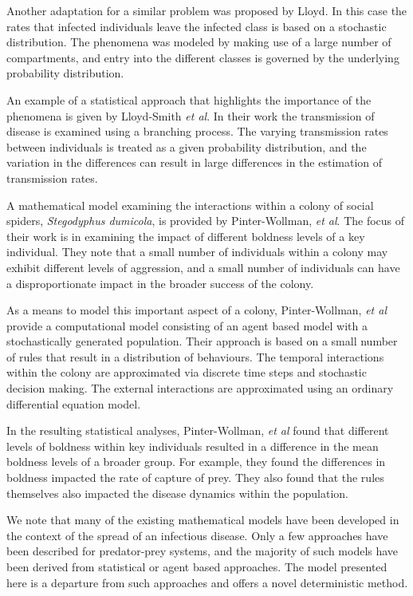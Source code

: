 \documentclass[review]{elsarticle}
\begin{document}
Another adaptation for a similar problem was proposed by
Lloyd\cite{doi:10.1098/rspb.2001.1599}. In this case the rates that
infected individuals leave the infected class is based on a stochastic
distribution. The phenomena was modeled by making use of a large
number of compartments, and entry into the different classes is
governed by the underlying probability distribution.

An example of a statistical approach that highlights the importance of
the phenomena is given by Lloyd-Smith \textit{et
  al}\cite{SuperspreadingLloyd}. In their work the transmission of
disease is examined using a branching process. The varying
transmission rates between individuals is treated as a given
probability distribution, and the variation in the differences can
result in large differences in the estimation of transmission rates.

A mathematical model examining the interactions within a colony of
social spiders, \textit{Stegodyphus dumicola}, is provided by
Pinter-Wollman, \textit{et al}\cite{doi:10.1086/687235}. The focus of
their work is in examining the impact of different boldness levels of
a key individual.  They note that a small number of individuals within
a colony may exhibit different levels of aggression, and a small
number of individuals can have a disproportionate impact in the
broader success of the colony.

As a means to model this important aspect of a colony, Pinter-Wollman,
\textit{et al}\cite{doi:10.1086/687235} provide a computational model
consisting of an agent based model with a stochastically generated
population. Their approach is based on a small number of rules that
result in a distribution of behaviours. The temporal interactions
within the colony are approximated via discrete time steps and
stochastic decision making. The external interactions are approximated
using an ordinary differential equation model.

In the resulting statistical analyses, Pinter-Wollman, \textit{et
  al}\cite{doi:10.1086/687235} found that different levels of boldness
within key individuals resulted in a difference in the mean boldness
levels of a broader group. For example, they found the differences in
boldness impacted the rate of capture of prey. They also found that
the rules themselves also impacted the disease dynamics within the
population.

We note that many of the existing mathematical models have been
developed in the context of the spread of an infectious disease. Only
a few approaches have been described for predator-prey systems, and
the majority of such models have been derived from statistical or
agent based approaches. The model presented here is a departure from
such approaches and offers a novel deterministic method.
\end{document}
